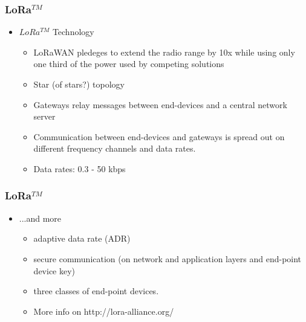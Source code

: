 \documentclass[12pt, compress]{beamer}
\begin{document}
\begin{frame}[fragile]
  \frametitle{LoRa$^{TM}$}
  \begin{itemize}
    \item $LoRa^{TM}$ Technology
    \begin{itemize}
      \item LoRaWAN pledeges to extend the radio range by 10x while using only one third of the power used by competing solutions 
      \item Star (of stars?) topology
      \item Gateways relay messages between end-devices and a central network server
      \item Communication between end-devices and gateways is spread out on different frequency channels and data rates.
      \item Data rates: 0.3 - 50 kbps
    \end{itemize}
  \end{itemize}
\end{frame}

\begin{frame}[fragile]
  \frametitle{LoRa$^{TM}$}
  \begin{itemize}
    \item ...and more
    \begin{itemize}
      \item adaptive data rate (ADR)
      \item secure communication (on network and application layers and end-point device key)
      \item three classes of end-point devices.
      \item More info on http://lora-alliance.org/
    \end{itemize}
  \end{itemize}
\end{frame}
\end{document}
